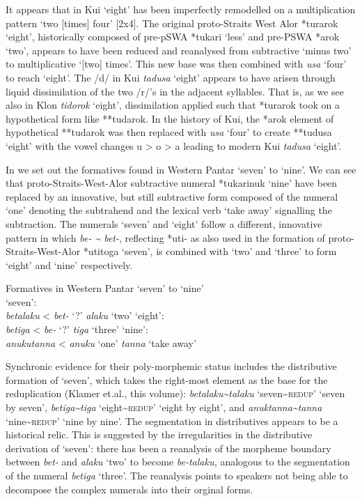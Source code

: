 \documentclass[output=paper]{LSP/langsci}
\begin{document}
It appears that in Kui `eight' has been imperfectly remodelled on a multiplication pattern `two [times] four' [2x4]. The original proto-Straits West Alor *turarok `eight', historically composed of pre-pSWA *tukari `less' and pre-PSWA *arok `two', appears to have been reduced and reanalysed from subtractive `minus two' to multiplicative `[two] times'. This new base was then combined with \textit{usa} `four' to reach `eight'. The /d/ in Kui \textit{tadusa} `eight' appears to have arisen through liquid dissimilation of the two /r/'s in the adjacent syllables. That is, as we see also in Klon \textit{tidorok} `eight', dissimilation applied such that *turarok took on a hypothetical form like **tudarok. In the history of Kui, the *arok element of hypothetical **tudarok was then replaced with \textit{usa} `four' to create **tudusa `eight' with the vowel changes u {\textgreater} o {\textgreater} a leading to modern Kui \textit{tadusa} `eight'.

In  we set out the formatives found in Western Pantar `seven' to `nine'. We can see that proto-Straits-West-Alor subtractive numeral *tukarinuk `nine' have been replaced by an innovative, but still subtractive form composed of the numeral `one' denoting the subtrahend and the lexical verb `take away' signalling the subtraction. The numerals `seven' and `eight' follow a different, innovative pattern in which \textit{be- \~{} bet-}, reflecting *{\texthtb}uti- as also used in the formation of proto-Straits-West-Alor *{\texthtb}utitoga `seven', is combined with `two' and `three' to form `eight' and `nine' respectively. 



\ea%
\label{ex:6:11}
Formatives in Western Pantar `seven' to `nine'\\
\ea `seven':\\
\textit{betalaku}    {\textless}  \textit{bet-} `?'   \textit{alaku} `two'  
\ex `eight':\\
\textit{betiga}      {\textless}  \textit{be-} `?'     \textit{tiga} `three'
\ex  `nine':\\
\textit{anukutanna}\textit{{\ng}}   {\textless}  \textit{anuku} `one'   \textit{tanna}\textit{{\ng}} `take away'
\z
\z

Synchronic evidence for their poly-morphemic status includes the distributive formation of `seven', which takes the right-most element as the base for the reduplication (Klamer et.al., this volume): \textit{betalaku\~{}talaku} `seven\textsc{\~{}redup}' `seven by seven', \textit{betiga\~{}tiga} `eight\textsc{\~{}redup}' `eight by eight', and \textit{anuktanna}\textit{{\ng}}\textit{\~{}tanna}\textit{{\ng}} `nine\textsc{\~{}redup}' `nine by nine'. The segmentation in distributives appears to be a historical relic. This is suggested by the irregularities in the distributive derivation of `seven': there has been a reanalysis of the morpheme boundary between \textit{bet-} and \textit{alaku} `two' to become \textit{be-talaku,} analogous to the segmentation of the numeral \textit{betiga} `three'. The reanalysis points to speakers not being able to decompose the complex numerals into their orginal forms.
\end{document}
